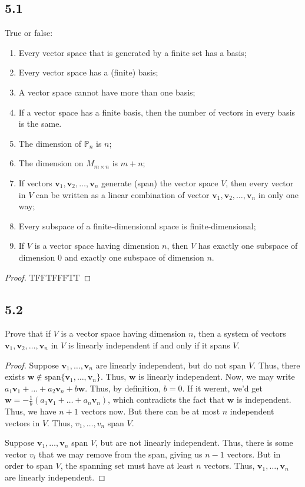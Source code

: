 \documentclass{amsart}
\begin{document}
\subsection*{5.1}
True or false:
\begin{enumerate}[label=\alph*)]
  \item Every vector space that is generated by a finite set has a basis;
  \item Every vector space has a (finite) basis;
  \item A vector space cannot have more than one basis;
  \item If a vector space has a finite basis, then the number of vectors in every basis is the same.
  \item The dimension of $\mathbb{P}_n$ is $n$;
  \item The dimension on $M_{m\times n}$ is $m+n$;
  \item If vectors $\mathbf{v}_1, \mathbf{v}_2, \ldots, \mathbf{v}_n$ generate (span) the vector space $V$, then every vector in $V$ can be written as a linear combination of vector $\mathbf{v}_1, \mathbf{v}_2, \ldots, \mathbf{v}_n$ in only one way;
  \item Every subspace of a finite-dimensional space is finite-dimensional;
  \item If $V$ is a vector space having dimension $n$, then $V$ has exactly one subspace of dimension $0$ and exactly one subspace of dimension $n$.
\end{enumerate}
\begin{proof}
    TFFTFFFTT
\end{proof}
\subsection*{5.2}
Prove that if $V$ is a vector space having dimension $n$, then a system of vectors $\mathbf{v}_1, \mathbf{v}_2, \ldots, \mathbf{v}_n$ in $V$ is linearly independent if and only if it spans $V$.
\begin{proof}
  Suppose $\mathbf{v}_1,\ldots,\mathbf{v}_n$ are linearly independent, but do not span $V$. Thus, there exists $\mathbf{w} \notin \text{span} \{\mathbf{v}_1,\ldots,\mathbf{v}_n\}$. Thus, $\mathbf{w}$ is linearly independent. Now, we may write $a_1\mathbf{v}_1+\ldots+a_2\mathbf{v}_n+b\mathbf{w}$. Thus, by definition, $b=0$. If it werent, we'd get $\mathbf{w} = -\frac{1}{b}(a_1\mathbf{v}_1 + \ldots + a_n \mathbf{v}_n)$, which contradicts the fact that $\mathbf{w}$ is independent. Thus, we have $n+1$ vectors now. But there can be at most $n$ independent vectors in $V$. Thus, $v_1,\ldots, v_n$ span $V$.

  Suppose $\mathbf{v}_1,\ldots,\mathbf{v}_n$ span $V$, but are not linearly independent. Thus, there is some vector $v_i$ that we may remove from the span, giving us $n-1$ vectors. But in order to span $V$, the spanning set must have at least $n$ vectors. Thus, $\mathbf{v}_1, \ldots, \mathbf{v}_n$ are linearly independent. 
\end{proof}
\end{document}
